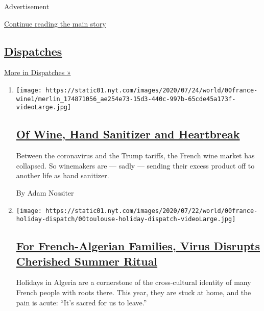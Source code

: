 Advertisement

\protect\hyperlink{after-mid2}{Continue reading the main story}

\hypertarget{dispatches}{%
\subsection{\texorpdfstring{\href{/spotlight/dispatches-international}{Dispatches}}{Dispatches}}\label{dispatches}}

\href{/spotlight/dispatches-international}{More in Dispatches »}

\begin{enumerate}
\def\labelenumi{\arabic{enumi}.}
\item
  \texttt{[image: https://static01.nyt.com/images/2020/07/24/world/00france-wine1/merlin\_174871056\_ae254e73-15d3-440c-997b-65cde45a173f-videoLarge.jpg]}

  \hypertarget{of-wine-hand-sanitizer-and-heartbreak}{%
  \subsection{\texorpdfstring{\href{/2020/07/27/world/europe/france-alsace-wine-coronavirus.html}{Of
  Wine, Hand Sanitizer and
  Heartbreak}}{Of Wine, Hand Sanitizer and Heartbreak}}\label{of-wine-hand-sanitizer-and-heartbreak}}

  Between the coronavirus and the Trump tariffs, the French wine market
  has collapsed. So winemakers are --- sadly --- sending their excess
  product off to another life as hand sanitizer.

  By Adam Nossiter
\item
  \texttt{[image: https://static01.nyt.com/images/2020/07/22/world/00france-holiday-dispatch/00toulouse-holiday-dispatch-videoLarge.jpg]}

  \hypertarget{for-french-algerian-families-virus-disrupts-cherished-summer-ritual}{%
  \subsection{\texorpdfstring{\href{/2020/07/26/world/europe/france-algeria-summer-vacations.html}{For
  French-Algerian Families, Virus Disrupts Cherished Summer
  Ritual}}{For French-Algerian Families, Virus Disrupts Cherished Summer Ritual}}\label{for-french-algerian-families-virus-disrupts-cherished-summer-ritual}}

  Holidays in Algeria are a cornerstone of the cross-cultural identity
  of many French people with roots there. This year, they are stuck at
  home, and the pain is acute: ``It's sacred for us to leave.''


\end{enumerate}
